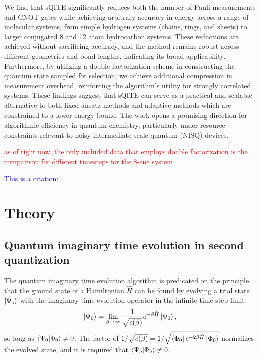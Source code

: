 \documentclass[aip,jcp,amsmath,amssymb, reprint]{revtex4-1}
\newcommand{\note}[2]{%
  \ifthenelse{\boolean{shownotes}}%
    {\textcolor{#1}{#2}}%
    {}%
}
\begin{document}
We find that sQITE significantly reduces both the number of Pauli measurements and CNOT gates while achieving arbitrary accuracy in energy across a range of molecular systems, from simple hydrogen systems (chains, rings, and sheets) to larger conjugated 8 and 12 atom hydrocarbon systems. These reductions are achieved without sacrificing accuracy, and the method remains robust across different geometries and bond lengths, indicating its broad applicability. Furthermore, by utilizing a double-factorization scheme in constructing the quantum state sampled for selection, we achieve additional compression in measurement overhead, reinforcing the algorithm’s utility for strongly correlated systems. These findings suggest that sQITE can serve as a practical and scalable alternative to both fixed ansatz methods and adaptive methods which are constrained to a lower energy bound. The work opens a promising direction for algorithmic efficiency in quantum chemistry, particularly under resource constraints relevant to noisy intermediate-scale quantum (NISQ) devices.

\note{red}{as of right now, the only included data that employs double factorization is the comparison for different timesteps for the 8-ene system}





\note{blue}{This is a citation: \cite{Schriber2016Adaptive}}

\section{\label{sec:theory}Theory}


\subsection{Quantum imaginary time evolution in second quantization}
The quantum imaginary time evolution algorithm is predicated on the principle that the ground state of a Hamiltonian $\hat{H}$ can be found by evolving a trial state $\ket{\Phi_o}$ with the imaginary time evolution operator in the infinite time-step limit
\begin{equation}
\ket{\Psi_0} = \lim_{\beta \rightarrow \infty} \frac{1}{\sqrt{ c(\beta) }} e^{-\beta \hat{H} } \ket{\Phi_0},
\end{equation}
so long as  $\braket{\Psi_0 | \Phi_0} \neq 0$.
The factor of $1 / \sqrt{ c(\beta) } = 1/ \sqrt{ \bra{\Phi_0} e^{-2 \beta \hat{H}} \ket{\Phi_0}}$ normalizes the evolved state, and it is required that $\braket{\Psi_o | \Phi_o} \neq 0$.  
\end{document}
